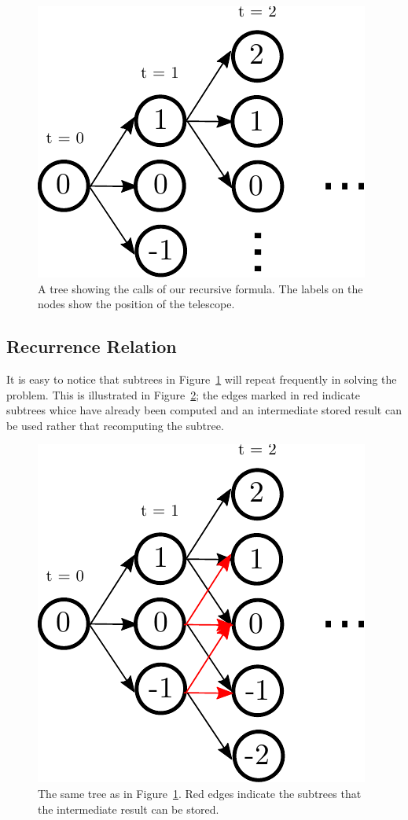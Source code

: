 \documentclass[titlepage,12pt]{article}
\begin{document}
\begin{figure}[H]
    \begin{center}
    \includegraphics[width=0.5\linewidth]{dp_recursive}
    \end{center}
    \caption{A tree showing the calls of our recursive formula. The
    labels on the nodes show the position of the telescope.}
    \label{fig:recursive}
\end{figure}

\subsection{Recurrence Relation}

It is easy to notice that subtrees in Figure~\ref{fig:recursive} will repeat
frequently in solving the problem. This is illustrated in Figure~\ref{fig:red};
the edges marked in red indicate subtrees whice have already been computed and
an intermediate stored result can be used rather that recomputing the subtree.

\begin{figure}[H]
    \begin{center}
    \includegraphics[width=0.5\linewidth]{dp_red}
    \end{center}
    \caption{The same tree as in Figure~\ref{fig:recursive}. Red edges indicate the
    subtrees that the intermediate result can be stored.}
    \label{fig:red}
\end{figure}
\end{document}
